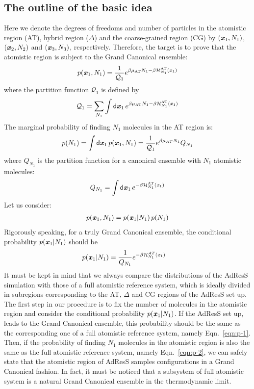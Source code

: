 \documentclass[aip,jcp,a4paper,reprint,onecolumn]{revtex4-1}
\newcommand{\vect}[1]{\textbf{\textit{#1}}}
\newcommand{\dd}[1]{\textsf{#1}}
\newcommand{\AT}{{\textrm{{AT}}}}
\newcommand{\HY}{{\Delta}}
\begin{document}
\subsection{The outline of the basic idea}
Here we denote the degrees of freedoms and number of particles in the
atomistic region (AT), hybrid region ($\HY$) and the coarse-grained
region (CG) by $(\vect x_1, N_1)$, $(\vect x_2, N_2)$ and $(\vect x_3,
N_3)$, respectively. Therefore, the target is to prove that the atomistic
region is subject to the Grand Canonical ensemble: 
\begin{align}
  p(\vect x_1, N_1) = \frac{1}{\mathcal Q_1}
  e^{\beta\mu_{\AT} N_1 - \beta \mathcal H_{N_1}^{\AT}(\vect x_1)} 
\end{align}
where the partition function $\mathcal Q_1$ is defined by
\begin{align}
  \mathcal Q_1 =
  \sum_{N_1}\int
  \dd d\vect x_1\,
  e^{\beta\mu_{\AT} N_1 - \beta \mathcal H_{N_1}^{\AT}(\vect x_1)}
\end{align}
The marginal probability of finding $N_1$ molecules in the
AT region is:
\begin{align}\label{eqn:p-2}
  p(N_1) = \int\dd d\vect x_1\, p(\vect x_1, N_1)
  =
  \frac{1}{\mathcal Q_1}e^{\beta\mu_{AT} N_1}Q_{N_1}
\end{align}
where $Q_{N_1}$ is the partition function for a canonical ensemble
with $N_1$ atomistic molecules:
\begin{align}
  Q_{N_1}  =
  \int\dd d\vect x_1\,
  e^{ - \beta \mathcal H_{N_1}^{\AT}(\vect x_1)}
\end{align}
Let us consider:
\begin{align}
  p(\vect x_1, N_1) = p(\vect x_1 | N_1)\,p(N_1)
\end{align}
Rigorously speaking, for a truly Grand Canonical ensemble,
the conditional probability $p(\vect x_1 | N_1)$ 
should be
\begin{align}\label{eqn:p-1}
  p(\vect x_1 | N_1) &= \frac{1}{Q_{N_1}} e^{-\beta \mathcal H_{N_1}^{AT}(\vect x_1)} \end{align}
It must be kept in mind that we always compare the distributions of the AdResS simulation
with those of a full atomistic reference system, which is ideally divided
in subregions corresponding to the AT, $\HY$ and CG regions of the AdResS
set up. The first step in our procedure is to fix the number of molecules in the atomistic
region and consider the conditional probability $p(\vect x_1 |
N_1)$. If the AdResS set up, leads to the Grand Canonical ensemble, this
probability should be the same as the corresponding one of a full
atomistic reference system, namely Eqn.~\eqref{eqn:p-1}.  Then, if the
probability of finding $N_1$ molecules in the atomistic region is also
the same as the full atomistic reference system, namely
Eqn.~\eqref{eqn:p-2}, we can safely state that the atomistic region of AdResS
samples configurations in a Grand Canonical fashion. In fact, it must be noticed that a subsystem of full atomistic system is a natural Grand Canonical ensemble in the thermodynamic limit. 
\end{document}
